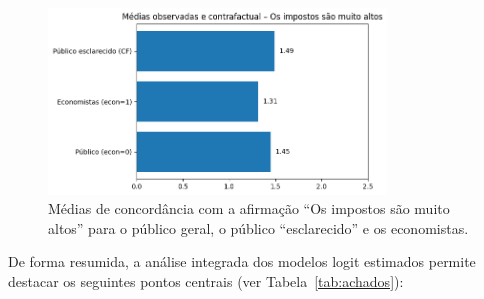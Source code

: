 \begin{figure}[htbp]
\centering
\includegraphics[width=0.8\textwidth]{Textuais/analise/imagens/impostos_muito_altos.png}
\caption{Médias de concordância com a afirmação ``Os impostos são muito altos'' para o público geral, o público ``esclarecido'' e os economistas.}
\label{fig:impostos}
\end{figure}

De forma resumida, a análise integrada dos modelos logit estimados permite destacar os seguintes pontos centrais (ver Tabela~\ref{tab:achados}): 

